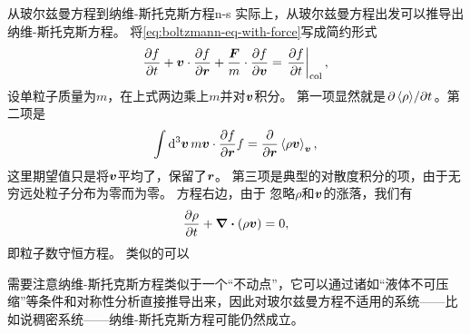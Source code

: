 \begin{back}{从玻尔兹曼方程到纳维-斯托克斯方程}{n-s}
    实际上，从玻尔兹曼方程出发可以推导出纳维-斯托克斯方程。
    将\eqref{eq:boltzmann-eq-with-force}写成简约形式
    \begin{equation}
        \pdv{f}{t} + \vb*{v} \cdot \pdv{f}{\vb*{r}} + \frac{\vb*{F}}{m} \cdot \pdv{f}{\vb*{v}} = \eval{\pdv{f}{t}}_\text{col},
    \end{equation}
    设单粒子质量为$m$，在上式两边乘上$m$并对$\vb*{v}$积分。
    第一项显然就是$\pdv*{\expval*{\rho}}{t}$。第二项是
    \[
        \int \dd[3]{\vb*{v}} m \vb*{v} \cdot \pdv{f}{\vb*{r}} f = \pdv{\vb*{r}} \expval{\rho \vb*{v}}_{\vb*{v}},
    \]
    这里期望值只是将$\vb*{v}$平均了，保留了$\vb*{r}$。
    第三项是典型的对散度积分的项，由于无穷远处粒子分布为零而为零。
    方程右边，由于
    忽略$\rho$和$\vb*{v}$的涨落，我们有
    \begin{equation}
        \pdv{\rho}{t} + \div{(\rho \vb*{v})} = 0,
    \end{equation}
    即粒子数守恒方程。
    类似的可以

    需要注意纳维-斯托克斯方程类似于一个“不动点”，它可以通过诸如“液体不可压缩”等条件和对称性分析直接推导出来，因此对玻尔兹曼方程不适用的系统——比如说稠密系统——纳维-斯托克斯方程可能仍然成立。
\end{back}